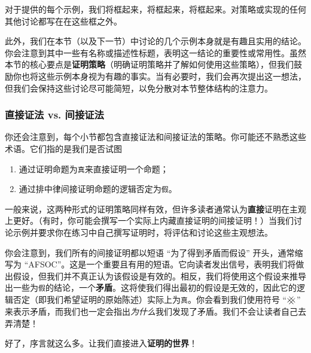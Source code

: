 对于提供的每个示例，我们将\setlength\fboxsep{1pt}框起来，将框起来，将框起来。对策略或实现的任何其他讨论都写在在这些框之外。

此外，我们在本节（以及下一节）中讨论的几个示例本身就是有趣且实用的结论。你会注意到其中一些有名称或描述性标题，表明这一结论的重要性或常用性。虽然本节的核心要点是\textbf{证明策略}（明确证明策略并了解如何使用这些策略），但我们鼓励你也将这些示例本身视为有趣的事实。当有必要时，我们会再次提出这一想法，但我们会保持这些讨论尽可能简短，以免分散对本节整体结构的注意力。

\subsubsection*{直接证法 vs. 间接证法}

你还会注意到，每个小节都包含直接证法和间接证法的策略。你可能还不熟悉这些术语。它们指的是我们是否试图
\begin{enumerate}[label=(\arabic*)]
    \item 通过证明命题为\verb|真|来直接证明一个命题；
    \item 通过排中律间接证明命题的逻辑否定为\verb|假|。
\end{enumerate}

一般来说，这两种形式的证明策略同样有效，但许多读者通常认为\textbf{直接}证明在主观上更好。（有时，你可能会撰写一个实际上内藏直接证明的间接证明！）当我们讨论示例并要求你在练习中自己撰写证明时，将评估和讨论这些主观想法。

你会注意到，我们所有的间接证明都以短语 ``为了得到矛盾而假设'' 开头，通常缩写为 ``AFSOC''。这是一个重要且有用的短语。它向读者发出信号，表明我们将做出假设，但我们并不真正认为该假设是有效的。相反，我们将使用这个假设来推导出一些为\verb|假|的结论，一个\textbf{矛盾}。这将使我们得出最初的假设是无效的，因此它的逻辑否定（即我们希望证明的原始陈述）实际上为\verb|真|。你会看到我们使用符号 ``$\hashx$'' 来表示矛盾，而我们也一定会指出\emph{为什么}我们发现了矛盾。我们不会让读者自己去弄清楚！

好了，序言就这么多。让我们直接进入\textbf{证明的世界}！


















